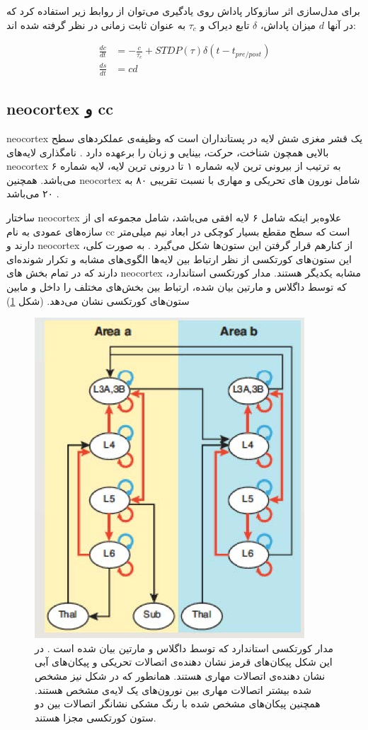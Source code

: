\documentclass[12pt]{report}
\begin{document}
	برای مدل‌سازی اثر سازوکار پاداش روی یادگیری می‌توان از روابط زیر استفاده کرد که در آنها $d$ میزان پاداش، $\delta$ تابع دیراک و $\tau_c$ به عنوان ثابت زمانی در نظر گرفته شده اند:
	
	\begin{align}
		\frac{dc}{dt} &= -\frac{c}{\tau_c} + STDP(\tau) \delta(t-t_{pre/post}) \\
		\frac{ds}{dt} &= cd
		\label{eq:rstdp}
	\end{align}
	
	
	\subsection{\gls{neocortex} و \gls{cc}}
	\gls{neocortex} یک قشر مغزی شش لایه در پستانداران است که وظیفه‌ی عملکرد‌های سطح بالایی همچون شناخت، حرکت، بینایی و زبان را برعهده دارد
	\cite{Lui2011}. نامگذاری لایه‌های \gls{neocortex} به ترتیب از بیرونی ترین لایه شماره ۱ تا درونی ترین لایه، لایه شماره ۶ می‌باشد.
	همچنین \gls{neocortex} شامل نورون های تحریکی و مهاری با نسبت تقریبی ۸۰ به ۲۰ می‌باشد
	\cite{noback2005human}.
	
	ساختار \gls{neocortex} علاوه‌بر اینکه شامل ۶ لایه افقی می‌باشد، شامل مجموعه ای از سازه‌های عمودی به نام \gls{cc} است که سطح مقطع بسیار کوچکی در ابعاد نیم میلی‌متر دارند و \gls{neocortex} از کنار‌هم قرار گرفتن این ستون‌ها شکل می‌گیرد
	\cite{Horton2005}.
	به صورت کلی، این ستون‌های کورتکسی از نظر ارتباط بین لایه‌ها الگوی‌های مشابه و تکرار شونده‌ای دارند که در تمام بخش های \gls{neocortex} مشابه یکدیگر هستند. مدار کورتکسی استاندارد، که توسط داگلاس و مارتین 
	\cite{Douglas2004}
	بیان شده، ارتباط بین بخش‌های مختلف را داخل و مابین ستون‌های کورتکسی نشان می‌دهد.
	(شکل \ref{fig:cc-doganmart})
	
	\begin{figure}[H]
		\centering
		\includegraphics[width=0.5\linewidth]{cc-con.jpg}
		\caption[NS]{
			مدار کورتکسی استاندارد که توسط داگلاس و مارتین بیان شده است
			\cite{Douglas2004}.
			در این شکل پیکان‌های قرمز نشان دهنده‌ی اتصالات تحریکی و پیکان‌های آبی نشان دهنده‌ی اتصالات مهاری هستند. همانطور که در شکل نیز مشخص شده بیشتر اتصالات مهاری بین نورون‌های یک لایه‌ی مشخص هستند. همچنین پیکان‌های مشخص شده با رنگ مشکی نشانگر اتصالات بین دو ستون کورتکسی مجزا هستند.
		}
		\label{fig:cc-doganmart}
	\end{figure}
	
\end{document}
